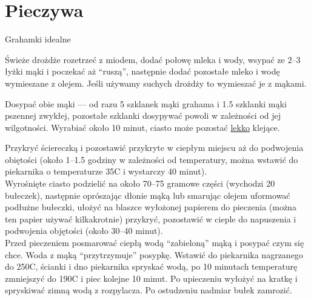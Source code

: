 \documentclass[a4paper,12pt]{article}
\begin{document}
\newpage
\section{Pieczywa}


\begin{recipe}{Grahamki idealne}{}{}


Świeże drożdże rozetrzeć z miodem, dodać połowę mleka i wody, wsypać ze 2--3 łyżki mąki i poczekać aż ``ruszą'',
następnie dodać pozostałe mleko i wodę wymieszane z olejem. Jeśli używamy suchych drożdży to  wymieszać je z mąkami.

Dosypać obie mąki --- od razu 5 szklanek mąki grahama i 1.5 szklanki mąki pszennej zwykłej, pozostałe  szklanki dosypywać powoli w zależności od jej wilgotności. Wyrabiać około 10 minut, ciasto
może pozostać \underline{lekko} klejące.

\freeform{}%
Przykryć ściereczką i pozostawić przykryte w ciepłym miejscu aż do podwojenia obiętości (około 1--1.5 godziny w zależności od temperatury, można wstawić do piekarnika o temperaturze 35\0C i
wystarczy 40 minut).\\

Wyrośnięte ciasto podzielić na około 70--75 gramowe części (wychodzi 20 bułeczek), następnie oprószając dłonie mąką lub smarując olejem uformować podłużne bułeczki, ułożyć na
blaszce wyłożonej papierem do pieczenia (można ten papier używać kilkakrotnie) przykryć, pozostawić w cieple do napuszenia i podwojenia objętości (około 30--40 minut).\\

Przed pieczeniem posmarować ciepłą wodą ``zabieloną'' mąką i posypać czym się chce. Woda z mąką ``przytrzymuje'' posypkę. Wstawić do piekarnika nagrzanego do 250\0C, ścianki i dno piekarnika spryskać wodą, po 10 minutach
temperaturę zmniejszyć do 190\0C i piec kolejne 10 minut. Po upieczeniu wyłożyć na kratkę i spryskiwać zimną wodą z rozpylacza. Po ostudzeniu nadmiar bułek zamrozić.

\end{recipe}

\newpage
\end{document}
